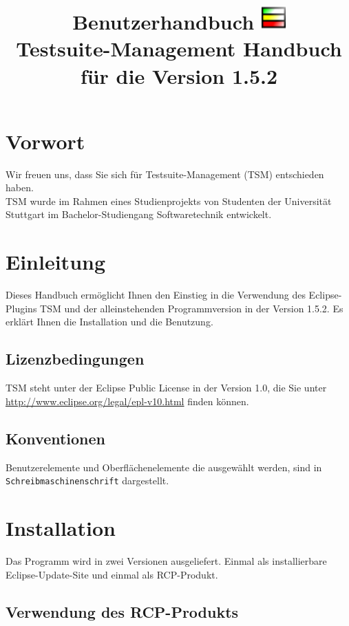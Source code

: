 \documentclass[11pt,a4paper,titlepage]{article}
\title{{\Huge Benutzerhandbuch} \linebreak \linebreak
\includegraphics[width= 35px]{BilderHandbuch/icon32.png} \\
\textbf{Testsuite-Management}
\linebreak \linebreak Handbuch für die Version 1.5.2}
\begin{document}
\maketitle
\pagebreak

\tableofcontents
\pagebreak

\section{Vorwort}
Wir freuen uns, dass Sie sich für Testsuite-Management (TSM) entschieden haben.\\
TSM wurde im Rahmen eines Studienprojekts von Studenten der Universität Stuttgart im Bachelor-Studiengang Softwaretechnik entwickelt.

\section{Einleitung}
Dieses Handbuch ermöglicht Ihnen den Einstieg in die Verwendung des Eclipse-Plugins TSM und der alleinstehenden Programmversion in der Version 1.5.2.
Es erklärt Ihnen die Installation und die Benutzung.\\


\subsection{Lizenzbedingungen}
TSM steht unter der Eclipse Public License in der Version 1.0, die Sie unter \href{http://www.eclipse.org/legal/epl-v10.html}{http://www.eclipse.org/legal/epl-v10.html} finden können.

\subsection{Konventionen}
Benutzerelemente und Oberflächenelemente die ausgewählt werden, sind in \texttt{Schreibmaschinenschrift} dargestellt.

\section{Installation}
Das Programm wird in zwei Versionen ausgeliefert. Einmal als installierbare Eclipse-Update-Site und einmal als RCP-Produkt. \\


\subsection{Verwendung des RCP-Produkts}
\end{document}
